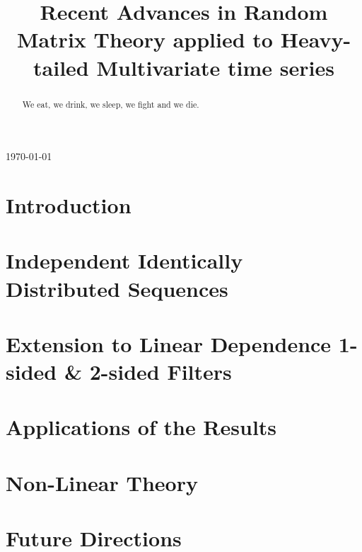 \documentclass[11pt,reqno]{amsart}
\newcommand{\1}{\mathds{1}}
\newcommand{\0}{\boldsymbol{0}}
\newcommand{\4}{\mathchoice{\mskip1.5mu}{\mskip1.5mu}{}{}}
\newcommand{\5}{\mathchoice{\mskip-1.5mu}{\mskip-1.5mu}{}{}}
\newcommand{\2}{\penalty250\mskip\thickmuskip\mskip-\thinmuskip} %
\begin{document}
\today

\title{Recent Advances in Random Matrix Theory applied to Heavy-tailed
Multivariate time series}
\begin{abstract}
  We eat, we drink, we sleep, we fight and we die.
\end{abstract}

\maketitle

\section{Introduction}\setcounter{equation}{0}
\section{Independent Identically Distributed Sequences}

\section{Extension to Linear Dependence 1-sided \& 2-sided Filters}
\section{Applications of the Results}

\section{Non-Linear Theory}
\section{Future Directions}
\end{document}
